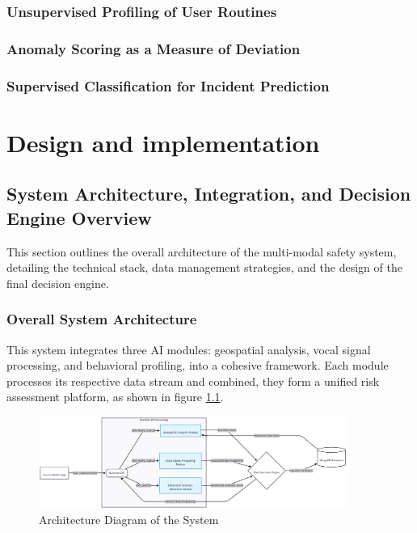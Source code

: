 \documentclass[12pt,a4paper,oneside,english]{book}
\begin{document}
{\subsection{Unsupervised Profiling of User Routines}
\label{sec:unsupervised_profiling}
\subsection{ Anomaly Scoring as a Measure of Deviation}
\label{sec:anomaly_scoring}
\subsection{Supervised Classification for Incident Prediction}
\label{sec:supervised_classification}


\chapter{Design and implementation}
\label{ch:4eme}

\section{System Architecture, Integration, and Decision Engine Overview}
\label{sec:system_architecture}
This section outlines the overall architecture of the multi-modal safety system, detailing the technical stack, data management strategies, and the design of the final decision engine.
\subsection{Overall System Architecture}
This system integrates three AI modules: geospatial analysis, vocal signal processing, and behavioral profiling, into a cohesive framework. 
Each module processes its respective data stream and combined, they form a unified risk assessment platform, as shown in figure \ref{fig:architecture}.
\begin{figure}[h!] %
    \centering
    \includegraphics[width=0.9\textwidth]{images/diag5.png}
    \caption{Architecture Diagram of the System}
    \label{fig:architecture}
\end{figure}

}
\end{document}
